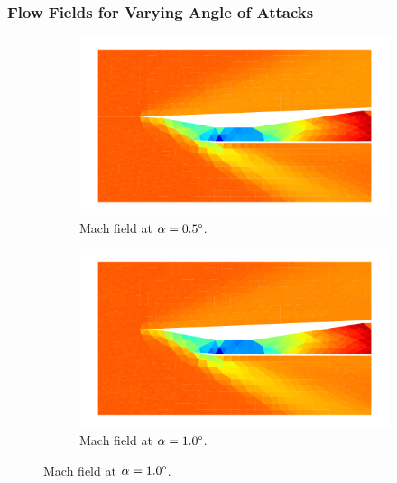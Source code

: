 \pagebreak
\subsubsection{Flow Fields for Varying Angle of Attacks}
\begin{figure}[h]
    \centering
    \begin{subfigure}[h]{0.48\linewidth}
        \centering
        \includegraphics[width=\linewidth]{rep/q5/mach_a5.pdf}
        \caption{Mach field at $\alpha=0.5\degree$.}
    \end{subfigure}
    \begin{subfigure}[h]{0.48\linewidth}
        \centering
        \includegraphics[width=\linewidth]{rep/q5/mach_a10.pdf}
        \caption{Mach field at $\alpha=1.0\degree$.}
    \end{subfigure}


\end{figure}
